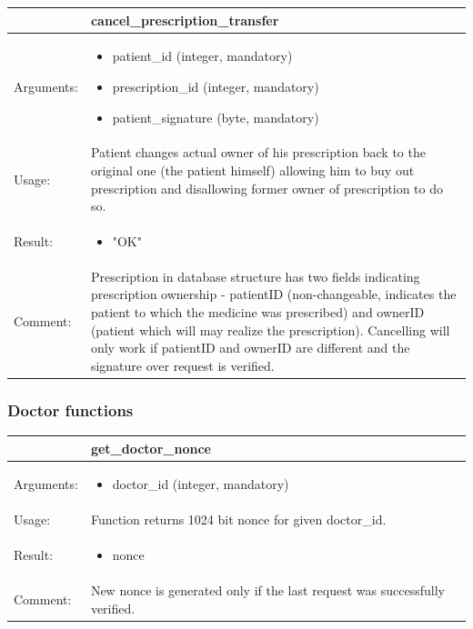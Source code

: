     \begin{longtable}{| p{6cm} | p{7.75cm} |}
    \hline
     & cancel\_prescription\_transfer \\ \hline
    Arguments: &  \begin{itemize}
    	\item patient\_id (integer, mandatory)
		\item prescription\_id (integer, mandatory)
		\item patient\_signature (byte, mandatory)
	\end{itemize}     \\ \hline
    Usage: & Patient changes actual owner of his prescription back to the original one (the patient himself) allowing him to buy out prescription and disallowing former owner of prescription to do so. \\ \hline
    Result: & \begin{itemize}
    	\item "OK"
	\end{itemize}     \\ \hline	
		Comment: & Prescription in database structure has two fields indicating prescription ownership - patientID (non-changeable, indicates the patient to which the medicine was prescribed) and ownerID (patient which will may realize the prescription). Cancelling will only work if patientID and ownerID are different and the signature over request is verified. \\ \hline
    \end{longtable}

\subsubsection{Doctor functions}


    \begin{longtable}{| p{6cm} | p{7.75cm} |}
    \hline
     & get\_doctor\_nonce \\ \hline
    Arguments: &  \begin{itemize}
    	\item doctor\_id (integer, mandatory)
	\end{itemize}     \\ \hline
    Usage: & Function returns 1024 bit nonce for given doctor\_id. \\ \hline
    Result: & \begin{itemize}
    	\item nonce
	\end{itemize}     \\ \hline	
			Comment: & New nonce is generated only if the last request was successfully verified.\\ \hline
    \end{longtable}


